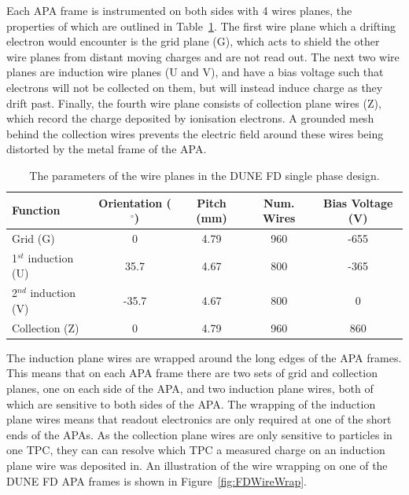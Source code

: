 Each APA frame is instrumented on both sides with 4 wires planes, the properties of which are outlined in Table~\ref{tab:DUNE_SP_WP}. The first wire plane which a drifting electron would encounter is the grid plane (G), which acts to shield the other wire planes from distant moving charges and are not read out. The next two wire planes are induction wire planes (U and V), and have a bias voltage such that electrons will not be collected on them, but will instead induce charge as they drift past. Finally, the fourth wire plane consists of collection plane wires (Z), which record the charge deposited by ionisation electrons. A grounded mesh behind the collection wires prevents the electric field around these wires being distorted by the metal frame of the APA. \\

\begin{table}
  \caption[The parameters of the wire planes in the DUNE FD single phase design]
          {The parameters of the wire planes in the DUNE FD single phase design.}
  \label{tab:DUNE_SP_WP}
  \centering
  \begin{tabular}{l c c c c}
    \toprule
    {Function}             & {Orientation ($^{\circ}$)} & {Pitch (mm)} & Num. Wires & Bias Voltage (V) \\ 
    \midrule
    Grid (G)               & 0                          & 4.79         & 960        & -655 \\
    
    1$^{st}$ induction (U) & 35.7                       & 4.67         & 800        & -365 \\
    
    2$^{nd}$ induction (V) & -35.7                      & 4.67         & 800        & 0    \\
    
    Collection (Z)         & 0                          & 4.79         & 960        & 860 \\
    \bottomrule
  \end{tabular}
\end{table}

The induction plane wires are wrapped around the long edges of the APA frames. This means that on each APA frame there are two sets of grid and collection planes, one on each side of the APA, and two induction plane wires, both of which are sensitive to both sides of the APA. The wrapping of the induction plane wires means that readout electronics are only required at one of the short ends of the APAs. As the collection plane wires are only sensitive to particles in one TPC, they can can resolve which TPC a measured charge on an induction plane wire was deposited in. An illustration of the wire wrapping on one of the DUNE FD APA frames is shown in Figure~\ref{fig:FDWireWrap}. \\

